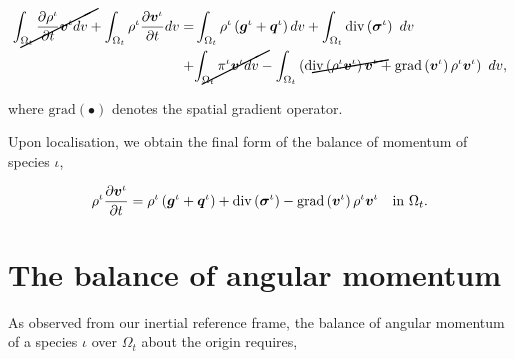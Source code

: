 

\begin{equation*}
\begin{split}
\cancel{\int_{\Omega_{t}} \frac{\partial \rho^{\iota}} {\partial t}
\bv^{\iota} dv} + \int_{\Omega_{t}} \rho^{\iota} \frac{\partial
  \bv^{\iota}} {\partial t} dv = 
& \int_{\Omega_{t}} \rho^{\iota} \left(\bg^{\iota}+\bq^{\iota}\right) dv 
+ \int_{\Omega_{t}} \mathrm{div}\left(\Bsigma^{\iota}\right)\ dv\\
+ & \cancel{\int_{\Omega_{t}} \pi^{\iota}\bv^{\iota} dv}
- \int_{\Omega_{t}}\left(\cancel{\mathrm{div}
\left(\rho^{\iota}\bv^{\iota}\right) \bv^{\iota}} +
\mathrm{grad}\left(\bv^{\iota}\right) \rho^{\iota}\bv^{\iota}\right)\ dv, 
\end{split}
\end{equation*}

where $\mathrm{grad} (\bullet)$ denotes the spatial gradient
operator.

Upon localisation, we obtain the final form of the balance of momentum
of species $\iota$,

\begin{equation}
\rho^{\iota} \frac{\partial \mbox{\boldmath$ v$}^{\iota}} {\partial t} = \rho^{\iota}
\left(\mbox{\boldmath$ g$}^{\iota}+\mbox{\boldmath$ q$}^{\iota}\right)  
+ \mathrm{div}\left(\mbox{\boldmath$\sigma$}^{\iota}\right)
- \mathrm{grad}\left(\mbox{\boldmath$ v$}^{\iota}\right) \rho^{\iota}\mbox{\boldmath$ v$}^{\iota}
\quad \mathrm{in}\ \Omega_{t}.
\label{localbalanceofmomentum}
\end{equation}


\section{The balance of angular momentum}
\label{balanceofangularmomentum}

As observed from our inertial reference frame, the balance of
angular momentum of a species $\iota$ over $\Omega_{t}$ about the
origin requires,

